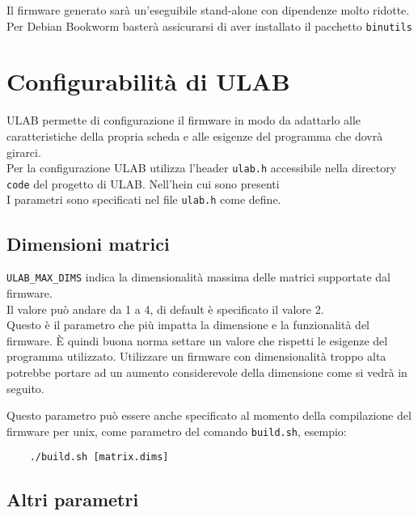 \documentclass[12pt,a4paper]{report}
\begin{document}
Il firmware generato sarà un'eseguibile stand-alone con
dipendenze molto ridotte. Per Debian Bookworm basterà assicurarsi di
aver installato il pacchetto \texttt{binutils}

\section{Configurabilità di ULAB}

ULAB permette di configurazione il firmware in modo da adattarlo alle
caratteristiche della propria scheda e alle esigenze del programma che
dovrà girarci.\\
Per la configurazione ULAB utilizza l'header
\texttt{ulab.h} accessibile nella directory \texttt{code} del progetto
di ULAB. Nell'hein cui sono presenti\\
I parametri sono specificati nel file \texttt{ulab.h} come define.

\subsection{Dimensioni matrici}\label{dimensioni-matrici}

\texttt{ULAB\_MAX\_DIMS} indica la dimensionalità massima delle matrici
supportate dal firmware.\\
Il valore può andare da 1 a 4, di default è specificato il valore 2.\\
Questo è il parametro che più impatta la dimensione e la funzionalità
del firmware. È quindi buona norma settare un valore che rispetti le
esigenze del programma utilizzato. Utilizzare un firmware con
dimensionalità troppo alta potrebbe portare ad un aumento considerevole
della dimensione come si vedrà in seguito.

Questo parametro può essere anche specificato al momento della
compilazione del firmware per unix, come parametro del comando
\texttt{build.sh}, esempio:

\begin{verbatim}
    ./build.sh [matrix.dims]
\end{verbatim}

\subsection{Altri parametri}\label{altri-parametri}
\end{document}
